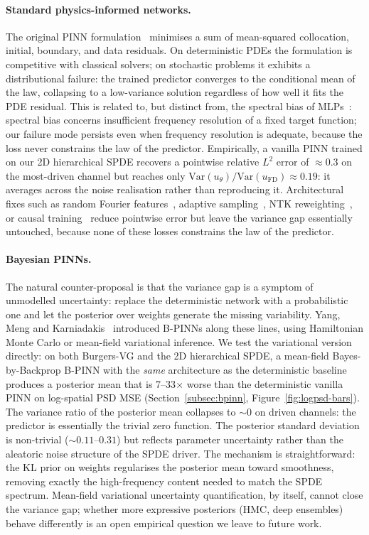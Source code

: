 \documentclass[review,12pt]{elsarticle}
\begin{document}
\paragraph{Standard physics-informed networks.}
The original PINN formulation~\cite{Raissi2019} minimises a sum of
mean-squared collocation, initial, boundary, and data residuals. On
deterministic PDEs the formulation is competitive with classical
solvers; on stochastic problems it exhibits a distributional failure:
the trained predictor converges to the conditional mean of the law,
collapsing to a low-variance solution regardless of how well it fits
the PDE residual. This is related to, but distinct from, the spectral
bias of MLPs~\cite{Rahaman2019,Tancik2020}: spectral bias concerns
insufficient frequency resolution of a fixed target function; our
failure mode persists even when frequency resolution is adequate,
because the loss never constrains the law of the predictor.
Empirically, a vanilla PINN trained on our 2D hierarchical SPDE
recovers a pointwise relative \(L^2\) error of \(\approx 0.3\) on the
most-driven channel but reaches only
\(\mathrm{Var}(u_\theta)/\mathrm{Var}(u_{\mathrm{FD}})\approx 0.19\):
it averages across the noise realisation rather than reproducing it.
Architectural fixes such as random Fourier
features~\cite{Tancik2020}, adaptive sampling~\cite{Lu2021DeepONet},
NTK reweighting~\cite{Wang2022}, or causal
training~\cite{Wang2024Causal} reduce pointwise error but leave the
variance gap essentially untouched, because none of these losses
constrains the law of the predictor.

\paragraph{Bayesian PINNs.}
The natural counter-proposal is that the variance gap is a symptom of
unmodelled uncertainty: replace the deterministic network with a
probabilistic one and let the posterior over weights generate the
missing variability. Yang, Meng and
Karniadakis~\cite{YangMengKarniadakis2021} introduced B-PINNs along
these lines, using Hamiltonian Monte Carlo or mean-field variational
inference. We test the variational version directly: on both
Burgers-VG and the 2D hierarchical SPDE, a mean-field
Bayes-by-Backprop B-PINN with the \emph{same} architecture as the
deterministic baseline produces a posterior mean that is
7--33\(\times\) worse than the deterministic vanilla PINN on
log-spatial PSD MSE (Section~\ref{subsec:bpinn},
Figure~\ref{fig:logpsd-bars}). The variance ratio of the posterior
mean collapses to \(\sim 0\) on driven channels: the predictor is
essentially the trivial zero function. The posterior standard
deviation is non-trivial (\(\sim 0.11\)--\(0.31\)) but reflects
parameter uncertainty rather than the aleatoric noise structure of
the SPDE driver. The mechanism is straightforward: the KL prior
on weights regularises the posterior mean toward smoothness,
removing exactly the high-frequency content needed to match the SPDE
spectrum. Mean-field variational uncertainty quantification, by
itself, cannot close the variance gap; whether more expressive
posteriors (HMC, deep ensembles) behave differently is an open
empirical question we leave to future work.
\end{document}

